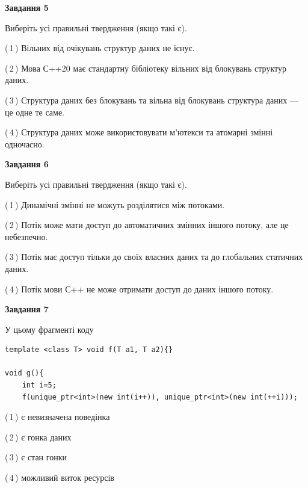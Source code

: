 \documentclass[12pt, ukrainian]{article}
\begin{document}
\begin {large}
{\begin{center}
\textbf{Завдання 5}
\end{center}

Виберіть усі правильні твердження (якщо такі є).\par
\vspace{2mm}

(\,1\,) Вільних від очікувань структур даних не існує.%

(\,2\,) Мова С++20 має стандартну бібліотеку вільних від блокувань структур даних.%

(\,3\,) Структура даних без блокувань та вільна від блокувань структура даних --- це одне те саме.%

(\,4\,) Структура даних може використовувати м’ютекси та атомарні змінні одночасно.%
\newpage


\begin{center}
\textbf{Завдання 6}
\end{center}

Виберіть усі правильні твердження (якщо такі є).\par
\vspace{2mm}

(\,1\,) Динамічні змінні не можуть розділятися між потоками.%

(\,2\,) Потік може мати доступ до автоматичних змінних іншого потоку, але це небезпечно.%

(\,3\,) Потік має доступ тільки до своїх власних даних та до глобальних статичних даних.%

(\,4\,) Потік мови С++ не може отримати доступ до даних іншого потоку.%


\begin{center}
\textbf{Завдання 7}
\end{center}

У цьому фрагменті коду
\begin{verbatim}
template <class T> void f(T a1, T a2){}

void g(){
    int i=5;
    f(unique_ptr<int>(new int(i++)), unique_ptr<int>(new int(++i)));
\end{verbatim}

(\,1\,) є невизначена поведінка%

(\,2\,) є гонка даних%

(\,3\,) є стан гонки%

(\,4\,) можливий виток ресурсів%

}
\end {large}

\vspace{4mm}
\newpage
\end{document}
